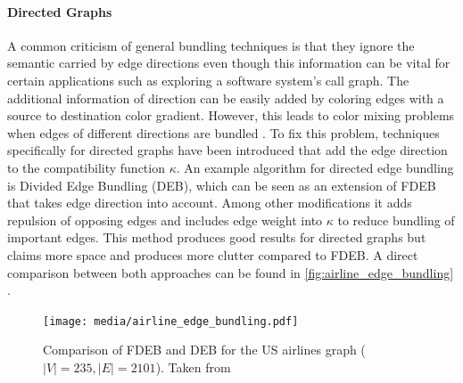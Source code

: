 \paragraph*{Directed Graphs}  A common criticism of general bundling techniques is that they ignore the semantic carried by edge directions even though this information can be vital for certain applications such as exploring a software system's call graph. The additional information of direction can be easily added by coloring edges with a source to destination color gradient. However, this leads to color mixing problems when edges of different directions are bundled \cite{Lhuillier2017}. To fix this problem, techniques specifically for directed graphs have been introduced that add the edge direction to the compatibility function $\kappa$. An example algorithm for directed edge bundling is Divided Edge Bundling (DEB)\cite{Selassie2011}, which can be seen as an extension of FDEB that takes edge direction into account. Among other modifications it adds repulsion of opposing edges and includes edge weight into $\kappa$ to reduce bundling of important edges. This method produces good results for directed graphs but claims more space and produces more clutter compared to FDEB. A direct comparison between both approaches can be found in \autoref{fig:airline_edge_bundling} \cite{Lhuillier2017}.\\


\begin{figure}
    \centering
    \texttt{[image: media/airline\_edge\_bundling.pdf]}
    \caption{Comparison of FDEB and DEB for the US airlines graph ($|V| = 235, |E| = 2101$). Taken from\cite{Lhuillier2017}}
    \label{fig:airline_edge_bundling}
\end{figure}


